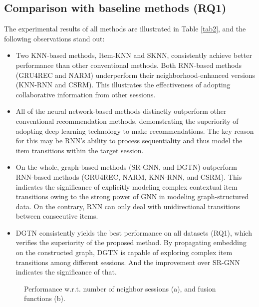 \documentclass[conference]{IEEEtran}
\begin{document}
\subsection{Comparison with baseline methods (RQ1)}
The experimental results of all methods are illustrated in Table \ref{tab2}, and the following observations stand out:
\begin{itemize}
    \item {Two KNN-based methods, Item-KNN and SKNN, consistently achieve better performance than other conventional methods. Both RNN-based methods (GRU4REC and NARM) underperform their neighborhood-enhanced versions (KNN-RNN and CSRM). This illustrates the effectiveness of adopting collaborative information from other sessions.}
    \item {All of the neural network-based methods distinctly outperform other conventional recommendation methods, demonstrating the superiority of adopting deep learning technology to make recommendations. The key reason for this may be RNN’s ability to process sequentiality and thus model the item transitions within the target session.}
    \item {On the whole, graph-based methods (SR-GNN, and DGTN) outperform RNN-based methods (GRU4REC, NARM, KNN-RNN, and CSRM). This indicates the significance of explicitly modeling complex contextual item transitions owing to the strong power of GNN in modeling graph-structured data. On the contrary, RNN can only deal with unidirectional transitions between consecutive items.}
\item {DGTN consistently yields the best performance on all datasets (RQ1), which verifies the superiority of the proposed method. By propagating embedding on the constructed graph, DGTN is capable of exploring complex item transitions among different sessions. And the improvement over SR-GNN indicates the significance of that.} 

\end{itemize}

\begin{figure}[t]
\centering
{}
\vspace{-4mm}
\caption{Performance w.r.t. number of neighbor sessions (a), and fusion functions (b). }
\label{fig:performance}
\vspace{-4mm}
\end{figure}
\end{document}
